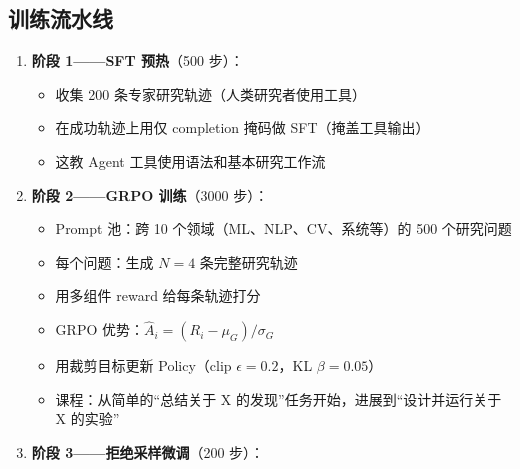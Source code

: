 \subsection{训练流水线}
\label{training-pipeline}

\begin{enumerate}
  \item \textbf{阶段 1——SFT 预热}（500 步）：

\begin{itemize}
  \item 收集 200 条专家研究轨迹（人类研究者使用工具）
  \item 在成功轨迹上用仅 completion 掩码做 SFT（掩盖工具输出）
  \item 这教 Agent 工具使用语法和基本研究工作流
\end{itemize}
  \item \textbf{阶段 2——GRPO 训练}（3000 步）：

\begin{itemize}
  \item Prompt 池：跨 10 个领域（ML、NLP、CV、系统等）的 500 个研究问题
  \item 每个问题：生成 $N=4$ 条完整研究轨迹
  \item 用多组件 reward 给每条轨迹打分
  \item GRPO 优势：$\hat{A}_i = (R_i - \mu_G) / \sigma_G$
  \item 用裁剪目标更新 Policy（clip $\epsilon=0.2$，KL $\beta=0.05$）
  \item 课程：从简单的``总结关于 X 的发现''任务开始，进展到``设计并运行关于 X 的实验''
\end{itemize}
  \item \textbf{阶段 3——拒绝采样微调}（200 步）：


\end{enumerate}

